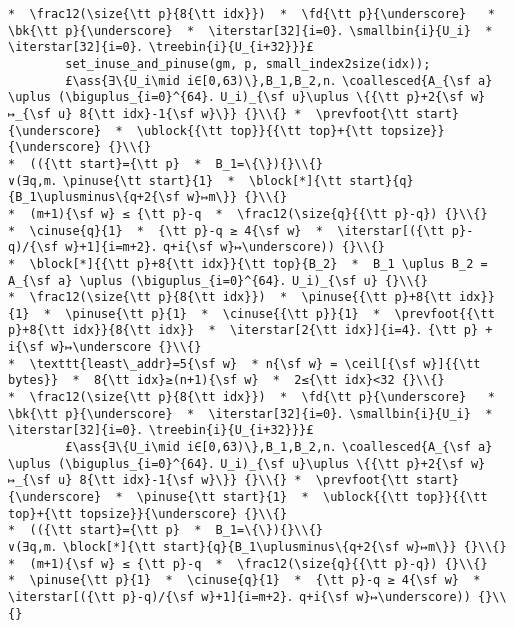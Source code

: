\documentclass[10pt,a4paper,twoside]{report}
\makeatletter
\newcommand{\ml}[2][t]{\mbox{\mdseries\begin{tabular}[#1]{@{}L@{}}#2\end{tabular}}}
\newcommand{\ass}[1]{\ensuremath{{\color{blue}\left\{\ml[c]{#1}\right\}}}}
\renewcommand{\ceil}[2][]{\left\lceil{#2}\right\rceil_{#1}}
\newcommand{\iterstar}[2][]{\text{\LARGE $*$}^{#1}_{#2}}
\makeatother
\begin{document}
\begin{lstlisting}
*  \frac12(\size{\tt p}{8{\tt idx}})  *  \fd{\tt p}{\underscore}   *  \bk{\tt p}{\underscore}  *  \iterstar[32]{i=0}．\smallbin{i}{U_i}  *  \iterstar[32]{i=0}．\treebin{i}{U_{i+32}}}£ 
        set_inuse_and_pinuse(gm, p, small_index2size(idx));
        £\ass{∃\{U_i\mid i∈[0,63)\},B_1,B_2,n．\coallesced{A_{\sf a} \uplus (\biguplus_{i=0}^{64}．U_i)_{\sf u}\uplus \{{\tt p}+2{\sf w}↦_{\sf u} 8{\tt idx}-1{\sf w}\}} {}\\{} *  \prevfoot{\tt start}{\underscore}  *  \ublock{{\tt top}}{{\tt top}+{\tt topsize}}{\underscore} {}\\{}
*  (({\tt start}={\tt p}  *  B_1=\{\}){}\\{}
∨(∃q,m．\pinuse{\tt start}{1}  *  \block[*]{\tt start}{q}{B_1\uplusminus\{q+2{\sf w}↦m\}} {}\\{}
*  (m+1){\sf w} ≤ {\tt p}-q  *  \frac12(\size{q}{{\tt p}-q}) {}\\{}
*  \cinuse{q}{1}  *  {\tt p}-q ≥ 4{\sf w}  *  \iterstar[({\tt p}-q)/{\sf w}+1]{i=m+2}．q+i{\sf w}↦\underscore)) {}\\{}
*  \block[*]{{\tt p}+8{\tt idx}}{\tt top}{B_2}  *  B_1 \uplus B_2 = A_{\sf a} \uplus (\biguplus_{i=0}^{64}．U_i)_{\sf u} {}\\{}
*  \frac12(\size{\tt p}{8{\tt idx}})  *  \pinuse{{\tt p}+8{\tt idx}}{1}  *  \pinuse{\tt p}{1}  *  \cinuse{{\tt p}}{1}  *  \prevfoot{{\tt p}+8{\tt idx}}{8{\tt idx}}  *  \iterstar[2{\tt idx}]{i=4}．{\tt p} + i{\sf w}↦\underscore {}\\{}
*  \texttt{least\_addr}=5{\sf w}  * n{\sf w} = \ceil[{\sf w}]{{\tt bytes}}  *  8{\tt idx}≥(n+1){\sf w}  *  2≤{\tt idx}<32 {}\\{}
*  \frac12(\size{\tt p}{8{\tt idx}})  *  \fd{\tt p}{\underscore}   *  \bk{\tt p}{\underscore}  *  \iterstar[32]{i=0}．\smallbin{i}{U_i}  *  \iterstar[32]{i=0}．\treebin{i}{U_{i+32}}}£ 
        £\ass{∃\{U_i\mid i∈[0,63)\},B_1,B_2,n．\coallesced{A_{\sf a} \uplus (\biguplus_{i=0}^{64}．U_i)_{\sf u}\uplus \{{\tt p}+2{\sf w}↦_{\sf u} 8{\tt idx}-1{\sf w}\}} {}\\{} *  \prevfoot{\tt start}{\underscore}  *  \pinuse{\tt start}{1}  *  \ublock{{\tt top}}{{\tt top}+{\tt topsize}}{\underscore} {}\\{}
*  (({\tt start}={\tt p}  *  B_1=\{\}){}\\{}
∨(∃q,m．\block[*]{\tt start}{q}{B_1\uplusminus\{q+2{\sf w}↦m\}} {}\\{}
*  (m+1){\sf w} ≤ {\tt p}-q  *  \frac12(\size{q}{{\tt p}-q}) {}\\{}
*  \pinuse{\tt p}{1}  *  \cinuse{q}{1}  *  {\tt p}-q ≥ 4{\sf w}  *  \iterstar[({\tt p}-q)/{\sf w}+1]{i=m+2}．q+i{\sf w}↦\underscore)) {}\\{}

\end{lstlisting}
\end{document}
